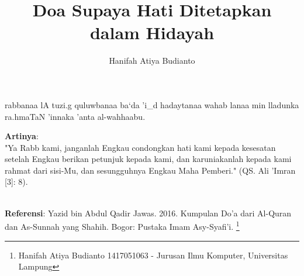 \documentclass[a4paper,12pt]{article}
\title{\Large Doa Supaya Hati Ditetapkan dalam Hidayah}
\author{\calligra Hanifah Atiya Budianto}
\begin{document}
\sffamily
\maketitle 
\fullvocalize
{}
\begin{arabtext}
\noindent
rabbanaa lA tuzi.g quluwbanaa ba`da 'i_d hadaytanaa wahab lanaa min 
lladunka ra.hmaTaN 'innaka 'anta al-wahhaabu.\\
\end{arabtext}
\noindent
\textbf{Artinya}:\\
\indent
"Ya Rabb kami, janganlah Engkau condongkan hati kami kepada kesesatan 
setelah Engkau berikan petunjuk kepada kami, dan karuniakanlah kepada kami 
rahmat dari sisi-Mu, dan sesungguhnya Engkau Maha Pemberi." (QS. Ali 
'Imran [3]: 8).\\\\
\par
\noindent
\textbf{Referensi}: Yazid bin Abdul Qadir Jawas. 2016. Kumpulan Do'a dari
Al-Quran dan As-Sunnah yang Shahih. Bogor: Pustaka Imam Asy-Syafi'i.
\footnote{Hanifah Atiya Budianto 1417051063 - Jurusan Ilmu Komputer,
Universitas Lampung}
\end{document}
